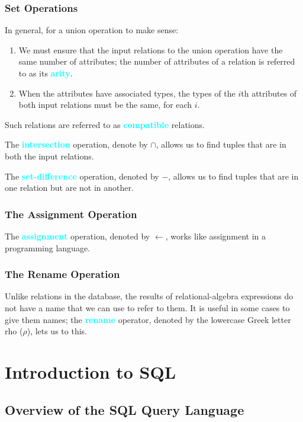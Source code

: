 \documentclass[a4paper,12pt,twoside,openany]{book}
\newcommand{\textcy}[1]{\textbf{\textcolor{cyan}{#1}}}
\begin{document}
\subsection{Set Operations}

In general, for a union operation to make sense:
\begin{enumerate}
    \item We must ensure that the input relations to the union operation have the same number of attributes; the number of attributes of a relation is referred to as its \textcy{arity}.
    \item When the attributes have associated types, the types of the $i$th attributes of both input relations must be the same, for each $i$.
\end{enumerate}
Such relations are referred to as \textcy{compatible} relations.

The \textcy{intersection} operation, denote by $\cap$, allows us to find tuples that are in both the input relations.

The \textcy{set-difference} operation, denoted by $-$, allows us to find tuples that are in one relation but are not in another.

\subsection{The Assignment Operation}

The \textcy{assignment} operation, denoted by $\leftarrow$, works like assignment in a programming language.

\subsection{The Rename Operation}

Unlike relations in the database, the results of relational-algebra expressions do not have a name that we can use to refer to them. It is useful in some cases to give them names; the \textcy{rename} operator, denoted by the lowercase Greek letter rho ($\rho$), lets us to this.

\chapter{Introduction to SQL}
\section{Overview of the SQL Query Language}
\end{document}
